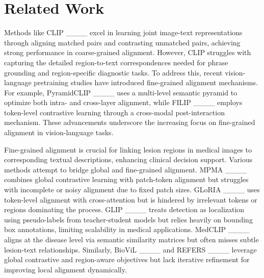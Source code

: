 \section{Related Work}
Methods like CLIP ____ excel in learning joint image-text representations through aligning matched pairs and contrasting unmatched pairs, achieving strong performance in coarse-grained alignment. However, CLIP struggles with capturing the detailed region-to-text correspondences needed for phrase grounding and region-specific diagnostic tasks. To address this, recent vision-language pretraining studies have introduced fine-grained alignment mechanisms. For example, PyramidCLIP ____ uses a multi-level semantic pyramid to optimize both intra- and cross-layer alignment, while FILIP ____ employs token-level contrastive learning through a cross-modal post-interaction mechanism. These advancements underscore the increasing focus on fine-grained alignment in vision-language tasks.

Fine-grained alignment is crucial for linking lesion regions in medical images to corresponding textual descriptions, enhancing clinical decision support. Various methods attempt to bridge global and fine-grained alignment. MPMA ____ combines global contrastive learning with patch-token alignment but struggles with incomplete or noisy alignment due to fixed patch sizes. GLoRIA ____ uses token-level alignment with cross-attention but is hindered by irrelevant tokens or regions dominating the process. GLIP ____ treats detection as localization using pseudo-labels from teacher-student models but relies heavily on bounding box annotations, limiting scalability in medical applications. MedCLIP ____ aligns at the disease level via semantic similarity matrices but often misses subtle lesion-text relationships. Similarly, BioViL ____ and REFERS ____ leverage global contrastive and region-aware objectives but lack iterative refinement for improving local alignment dynamically.